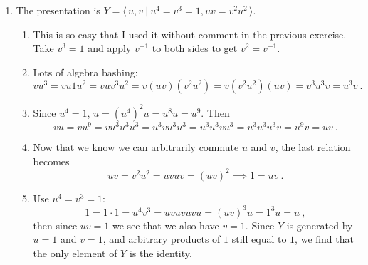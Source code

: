 \documentclass[]{article}
\begin{document}
\begin{enumerate}
\item The presentation is $Y = \langle\, u,v \ \vert\ u^4=v^3=1, uv=v^2u^2\, \rangle$.
\begin{enumerate}
\item This is so easy that I used it without comment in the previous exercise. Take $v^3 = 1$ and apply $v^{-1}$ to both sides to get $v^2 = v^{-1}$.
\item Lots of algebra bashing:
\begin{equation}
vu^3 = vu1u^2 = vuv^3u^2 = v(uv)(v^2u^2) = v(v^2u^2)(uv) = v^3u^3v = u^3v\ .
\end{equation}
\item Since $u^4 = 1$, $u = (u^4)^2u = u^8u = u^9$. Then
\begin{equation}
vu = vu^9 = vu^3u^3u^3 = u^3vu^3u^3 = u^3u^3vu^3 = u^3u^3u^3v = u^9v = uv\ .
\end{equation}
\item Now that we know we can arbitrarily commute $u$ and $v$, the last relation becomes
\begin{equation}
uv = v^2u^2 = uvuv = (uv)^2 \implies 1 = uv\ .
\end{equation}
\item Use $u^4 = v^3 = 1$:
\begin{equation}
1 = 1\cdot 1 = u^4v^3 = uvuvuvu = (uv)^3u = 1^3u = u\ ,
\end{equation}
then since $uv = 1$ we see that we also have $v = 1$. Since $Y$ is generated by $u=1$ and $v=1$, and arbitrary products of $1$ still equal to $1$, we find that the only element of $Y$ is the identity.

\end{enumerate}













\end{enumerate}
\end{document}
